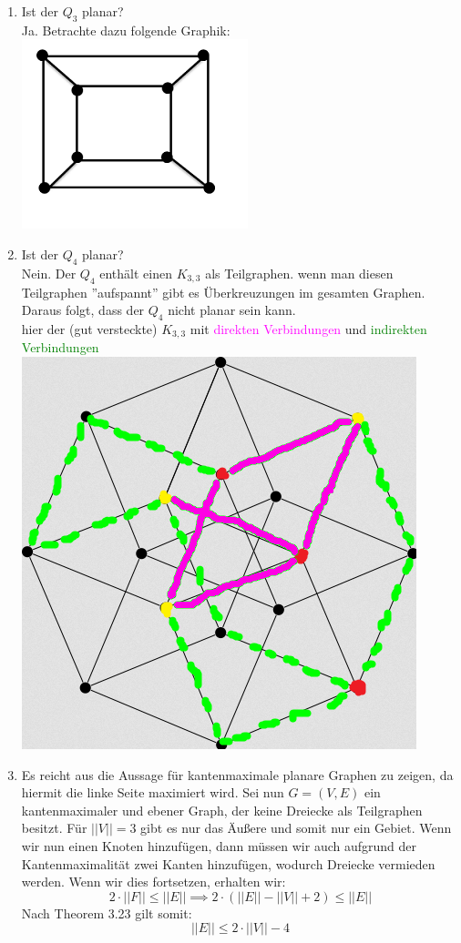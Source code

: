 \begin{enumerate}[label=(\alph*)]
        \item Ist der $Q_3$ planar? \\
        Ja. Betrachte dazu folgende Graphik:\\
        \includegraphics[width=0.3\linewidth]{Q3}
        
        \item Ist der $Q_4$ planar?\\
        Nein. Der $Q_4$ enthält einen $K_{3,3}$ als Teilgraphen. wenn man diesen Teilgraphen ''aufspannt'' 
        gibt es Überkreuzungen im gesamten Graphen. Daraus folgt, dass der $Q_4$ nicht planar sein kann. \\
        hier der (gut versteckte) $K_{3,3}$ mit \textcolor{magenta}{direkten Verbindungen} und \textcolor{green}{indirekten Verbindungen} \\ \includegraphics{Q4}
        
        \item Es reicht aus die Aussage für kantenmaximale planare Graphen zu zeigen, da hiermit die 
        linke Seite maximiert wird. Sei nun $G=(V,E)$ ein kantenmaximaler und ebener Graph, der keine 
        Dreiecke als Teilgraphen besitzt. Für $||V||=3$ gibt es nur das Äußere und somit nur ein Gebiet. 
        Wenn wir nun einen Knoten hinzufügen, dann müssen wir auch aufgrund der Kantenmaximalität zwei 
        Kanten hinzufügen, wodurch Dreiecke vermieden werden.  Wenn wir dies fortsetzen, erhalten wir:
        $$ 2 \cdot ||F|| \le ||E||\implies 2 \cdot \left(||E|| - ||V|| + 2 \right) \le ||E||$$
        Nach Theorem 3.23 gilt somit:
        $$||E|| \le 2 \cdot ||V|| - 4 $$ 
        

\end{enumerate}
